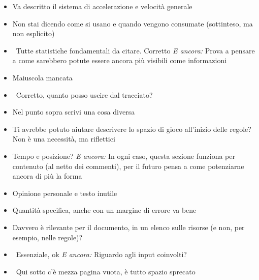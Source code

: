 {\begin{itemize}
  \item {} Va descritto il sistema di accelerazione e velocità generale
  \item {} Non stai dicendo come si usano e quando vengono consumate (sottinteso, ma non esplicito)
  \item {} \rvBene\ Tutte statistiche fondamentali da citare. Corretto \emph{E ancora:} Prova a pensare a come sarebbero potute essere ancora più visibili come informazioni
  \item {} Maiuscola mancata
  \item {} \rvBene\ Corretto, quanto posso uscire dal tracciato?
  \item {} Nel punto sopra scrivi una cosa diversa
  \item {} Ti avrebbe potuto aiutare descrivere lo spazio di gioco all'inizio delle regole? Non è una necessità, ma riflettici
  \item {} Tempo e posizione? \emph{E ancora:} In ogni caso, questa sezione funziona per contenuto (al netto dei commenti), per il futuro pensa a come potenziarne ancora di più la forma
  \item {} Opinione personale e testo inutile
  \item {} Quantità specifica, anche con un margine di errore va bene
  \item {} Davvero è rilevante per il documento, in un elenco sulle risorse (e non, per esempio, nelle regole)?
  \item {} \rvBene\ Essenziale, ok \emph{E ancora:} Riguardo agli input coinvolti?
  \item \rvVuoto\ Qui sotto c'è mezza pagina vuota, è tutto spazio sprecato
\end{itemize}
}

